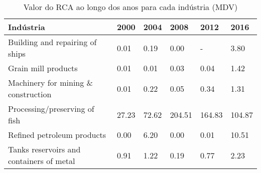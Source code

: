 \begin{table}
\centering
\caption{Valor do RCA ao longo dos anos para cada indústria (MDV)}
\begin{tabular}{p{6cm}p{1.5cm}p{1.5cm}p{1.5cm}p{1.5cm}p{1.5cm}}
\toprule
                               Indústria &  2000 &  2004 &   2008 &   2012 &   2016 \\
\midrule
         Building and repairing of ships &  0.01 &  0.19 &   0.00 &      - &   3.80 \\
                     Grain mill products &  0.01 &  0.01 &   0.03 &   0.04 &   1.42 \\
     Machinery for mining \& construction &  0.01 &  0.22 &   0.05 &   0.34 &   1.31 \\
           Processing/preserving of fish & 27.23 & 72.62 & 204.51 & 164.83 & 104.87 \\
              Refined petroleum products &  0.00 &  6.20 &   0.00 &   0.01 &  10.51 \\
Tanks reservoirs and containers of metal &  0.91 &  1.22 &   0.19 &   0.77 &   2.23 \\
\bottomrule
\end{tabular}
\end{table}
